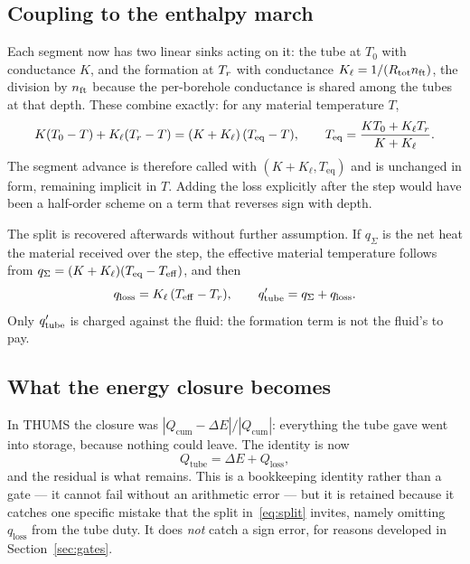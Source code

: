 \subsection{Coupling to the enthalpy march}

Each segment now has two linear sinks acting on it: the tube at $T_0$ with
conductance $K$, and the formation at $T_{r}$ with conductance
$K_\ell = 1/(R_{\mathrm{tot}} n_{\mathrm{ft}})$, the division by $n_{\mathrm{ft}}$ because the per-borehole
conductance is shared among the tubes at that depth. These combine exactly:
for any material temperature $T$,
\begin{equation}
K(T_0 - T) + K_\ell(T_{r} - T)
  = (K + K_\ell)\,(T_{\mathrm{eq}} - T),
\qquad
T_{\mathrm{eq}} = \frac{K T_0 + K_\ell T_{r}}{K + K_\ell}.
\label{eq:combine}
\end{equation}
The segment advance is therefore called with $(K + K_\ell, T_{\mathrm{eq}})$
and is unchanged in form, remaining implicit in $T$. Adding the loss
explicitly after the step would have been a half-order scheme on a term that
reverses sign with depth.

The split is recovered afterwards without further assumption. If $q_{\Sigma}$
is the net heat the material received over the step, the effective material
temperature follows from $q_{\Sigma} = (K+K_\ell)(T_{\mathrm{eq}} - T_{\rm
eff})$, and then
\begin{equation}
q_{\mathrm{loss}} = K_\ell\,(T_{\mathrm{eff}} - T_{r}),
\qquad
q'_{\mathrm{tube}} = q_{\Sigma} + q_{\mathrm{loss}} .
\label{eq:split}
\end{equation}
Only $q'_{\mathrm{tube}}$ is charged against the fluid: the formation term is
not the fluid's to pay.

\subsection{What the energy closure becomes}

In THUMS the closure was $|Q_{\mathrm{cum}} - \Delta E|/|Q_{\mathrm{cum}}|$:
everything the tube gave went into storage, because nothing could leave. The
identity is now
\begin{equation}
Q_{\mathrm{tube}} = \Delta E + Q_{\mathrm{loss}},
\end{equation}
and the residual is what remains. This is a bookkeeping identity rather than a
gate --- it cannot fail without an arithmetic error --- but it is retained
because it catches one specific mistake that the split in~\eqref{eq:split}
invites, namely omitting $q_{\mathrm{loss}}$ from the tube duty. It does
\emph{not} catch a sign error, for reasons developed in
Section~\ref{sec:gates}.

